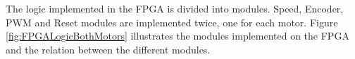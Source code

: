 \documentclass[../../main.tex]{subfiles}
\begin{document}
The logic implemented in the FPGA is divided into modules. Speed, Encoder, PWM and Reset modules are implemented twice, one for each motor. Figure \ref{fig:FPGALogicBothMotors} illustrates the modules implemented on the FPGA and the relation between the different modules.     
    
    
\end{document}
